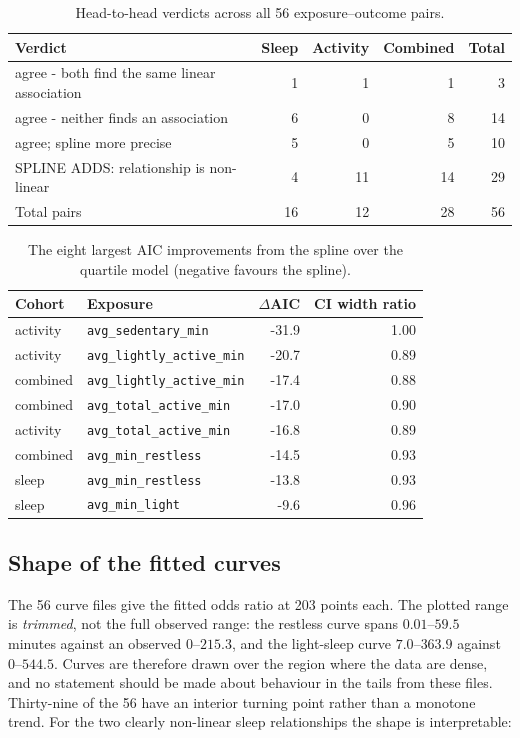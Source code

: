 \documentclass[11pt]{article}
\newcommand{\code}[1]{\texttt{\small #1}}
\begin{document}
\begin{table}[h]\centering\footnotesize\begin{tabular}{@{}p{7.2cm}rrrr@{}}\toprule
\textbf{Verdict} & \textbf{Sleep} & \textbf{Activity} & \textbf{Combined} & \textbf{Total} \\ \midrule
agree - both find the same linear association & 1 & 1 & 1 & 3 \\
agree - neither finds an association & 6 & 0 & 8 & 14 \\
agree; spline more precise & 5 & 0 & 5 & 10 \\
SPLINE ADDS: relationship is non-linear & 4 & 11 & 14 & 29 \\
\midrule Total pairs & 16 & 12 & 28 & 56 \\
\bottomrule\end{tabular}\caption{Head-to-head verdicts across all 56 exposure--outcome pairs.}\label{tab:res-qvs}\end{table}
\begin{table}[h]\centering\footnotesize\begin{tabular}{@{}llrr@{}}\toprule
\textbf{Cohort} & \textbf{Exposure} & \textbf{$\Delta$AIC} & \textbf{CI width ratio} \\ \midrule
activity & \code{avg\_sedentary\_min} & -31.9 & 1.00 \\
activity & \code{avg\_lightly\_active\_min} & -20.7 & 0.89 \\
combined & \code{avg\_lightly\_active\_min} & -17.4 & 0.88 \\
combined & \code{avg\_total\_active\_min} & -17.0 & 0.90 \\
activity & \code{avg\_total\_active\_min} & -16.8 & 0.89 \\
combined & \code{avg\_min\_restless} & -14.5 & 0.93 \\
sleep & \code{avg\_min\_restless} & -13.8 & 0.93 \\
sleep & \code{avg\_min\_light} & -9.6 & 0.96 \\
\bottomrule\end{tabular}\caption{The eight largest AIC improvements from the spline over the quartile model (negative favours the spline).}\label{tab:res-aic}\end{table}

\subsection{Shape of the fitted curves}
\label{sec:res-curves}
The 56 curve files give the fitted odds ratio at 203 points each. The plotted range is
\emph{trimmed}, not the full observed range: the restless curve spans $0.01$--$59.5$ minutes
against an observed $0$--$215.3$, and the light-sleep curve $7.0$--$363.9$ against $0$--$544.5$.
Curves are therefore drawn over the region where the data are dense, and no statement should be
made about behaviour in the tails from these files. Thirty-nine of the 56 have an interior turning
point rather than a monotone trend. For the two clearly non-linear sleep relationships the shape is
interpretable:
\end{document}
